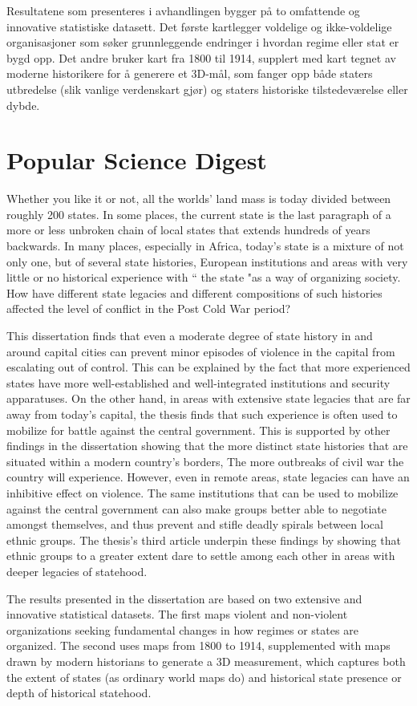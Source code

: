 \documentclass[12pt]{article}
\begin{document}
Resultatene som presenteres i avhandlingen bygger på to omfattende og innovative
statistiske datasett. Det første kartlegger voldelige og ikke-voldelige
organisasjoner som søker grunnleggende endringer i hvordan regime eller stat er
bygd opp. Det andre bruker kart fra 1800 til 1914, supplert med kart tegnet av
moderne historikere for å generere et 3D-mål, som fanger opp både staters
utbredelse (slik vanlige verdenskart gjør) og staters historiske
tilstedeværelse eller dybde.

\section{Popular Science Digest}

Whether you like it or not, all the worlds' land mass is today divided between
roughly 200 states. In some places, the current state is the last paragraph of a
more or less unbroken chain of local states that extends hundreds of years
backwards. In many places, especially in Africa, today's state is a mixture of
not only one, but of several state histories, European institutions and areas
with very little or no historical experience with `` the state "as a way of
organizing society. How have different state legacies and different compositions
of such histories affected the level of conflict in the Post Cold War period?

This dissertation finds that even a moderate degree of state history in and
around capital cities can prevent minor episodes of violence in the capital from
escalating out of control. This can be explained by the fact that more
experienced states have more well-established and well-integrated institutions
and security apparatuses. On the other hand, in areas with extensive state
legacies that are far away from today's capital, the thesis finds that such
experience is often used to mobilize for battle against the central government.
This is supported by other findings in the dissertation showing that the more
distinct state histories that are situated within a modern country's borders,
The more outbreaks of civil war the country will experience. However, even in
remote areas, state legacies can have an inhibitive effect on violence. The same
institutions that can be used to mobilize against the central government can
also make groups better able to negotiate amongst themselves, and thus prevent
and stifle deadly spirals between local ethnic groups. The thesis's third
article underpin these findings by showing that ethnic groups to a greater
extent dare to settle among each other in areas with deeper legacies of
statehood.

The results presented in the dissertation are based on two extensive and
innovative statistical datasets. The first maps violent and non-violent
organizations seeking fundamental changes in how regimes or states are
organized. The second uses maps from 1800 to 1914, supplemented with maps drawn
by modern historians to generate a 3D measurement, which captures both the
extent of states (as ordinary world maps do) and historical state presence or
depth of historical statehood.

\clearpage



\end{document}
